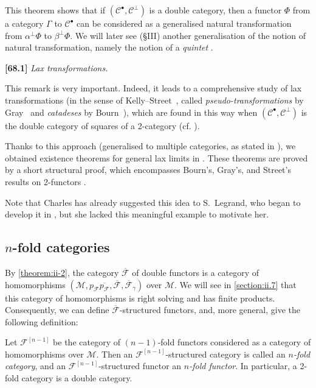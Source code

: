 \documentclass[a4paper,fleqn]{article}
\theoremstyle{plain}
\theoremstyle{definition}
\newenvironment{definition}[1]
  {\renewcommand\theinnerdefinition{#1}\innerdefinition}
  {\endinnerdefinition}
\newenvironment{longcomm}[1]
  {\noindent\textbf{[#1]}\rmfamily}
  {}
\newcommand{\CC}{\mathcal{C}}
\newcommand{\MM}{\mathcal{M}}
\newcommand{\FF}{\mathcal{F}}
\newcommand{\smallbullet}{\bullet}
\begin{document}
This theorem shows that if $(\CC^\smallbullet,\CC^\perp)$ is a double category, then a functor $\Phi$ from a category $\Gamma$ to $\CC^\smallbullet$ can be considered as a generalised natural transformation from $\alpha^\perp\Phi$ to $\beta^\perp\Phi$.
We will later see ({§III}) another generalisation of the notion of natural transformation, namely the notion of a \emph{quintet} \cite{3e}.

\begin{longcomm}{68.1}
  \emph{Lax transformations.}

  This remark is very important.
  Indeed, it leads to a comprehensive study of lax transformations (in the sense of Kelly--Street~\cite{comm59}, called \emph{pseudo-transformations} by Gray~\cite{comm40} and \emph{catadeses} by Bourn~\cite{comm14}), which are found in this way when $(\CC^\smallbullet,\CC^\perp)$ is the double category of squares of a 2-category (cf. \cite[Comment~105.1]{coll64}).

  Thanks to this approach (generalised to multiple categories, as stated in \cite[Remark~3, p.~399]{coll117}), we obtained existence theorems for general lax limits in \cite{coll119,coll121}.
  These theorems are proved by a short structural proof, which encompasses Bourn's, Gray's, and Street's results on 2-functors \cite{comm14,comm40,comm92}.

  Note that Charles has already suggested this idea to S.~Legrand, who began to develop it in \cite{comm67}, but she lacked this meaningful example to motivate her.
\end{longcomm}


\subsection{$n$-fold categories}
\label{section:ii.5}

By \cref{theorem:ii-2}, the category $\overline{\FF}$ of double functors is a category of homomorphisms $(\MM,p_\FF\overline{p_\FF},\overline{\FF},\overline{\FF}_\gamma)$ over $\MM$.
We will see in \cref{section:ii.7} that this category of homomorphisms is right solving and has finite products.
Consequently, we can define $\overline{\FF}$-structured functors, and, more general, give the following definition:

\begin{definition}{15}
\label{definition:ii-15}
  Let $\FF^{[n-1]}$ be the category of $(n-1)$-fold functors considered as a category of homomorphisms over $\MM$.
  Then an $\FF^{[n-1]}$-structured category is called an \emph{$n$-fold category}, and an $\FF^{[n-1]}$-structured functor an \emph{$n$-fold functor}.
  In particular, a 2-fold category is a double category.
\end{definition}
\end{document}
